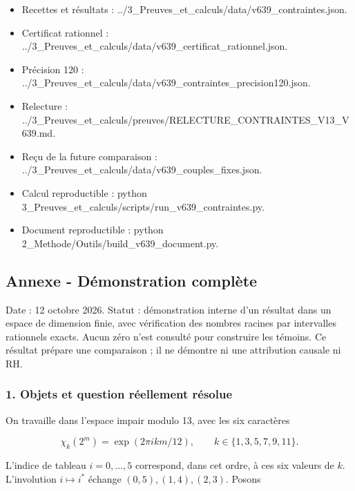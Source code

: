 \documentclass[
  10pt,
  a4paper,
]{article}
\providecommand{\tightlist}{%
  \setlength{\itemsep}{0pt}\setlength{\parskip}{0pt}}
\begin{document}
\begin{itemize}
\tightlist
\item
  Recettes et résultats :
  ../3\_Preuves\_et\_calculs/data/v639\_contraintes.json.
\item
  Certificat rationnel :
  ../3\_Preuves\_et\_calculs/data/v639\_certificat\_rationnel.json.
\item
  Précision 120 :
  ../3\_Preuves\_et\_calculs/data/v639\_contraintes\_precision120.json.
\item
  Relecture :
  ../3\_Preuves\_et\_calculs/preuves/RELECTURE\_CONTRAINTES\_V13\_V639.md.
\item
  Reçu de la future comparaison :
  ../3\_Preuves\_et\_calculs/data/v639\_couples\_fixes.json.
\item
  Calcul reproductible : python
  3\_Preuves\_et\_calculs/scripts/run\_v639\_contraintes.py.
\item
  Document reproductible : python
  2\_Methode/Outils/build\_v639\_document.py.
\end{itemize}

\hypertarget{annexe---duxe9monstration-compluxe8te}{%
\subsection{Annexe - Démonstration
complète}\label{annexe---duxe9monstration-compluxe8te}}

Date : 12 octobre 2026. Statut : démonstration interne d'un résultat
dans un espace de dimension finie, avec vérification des nombres racines
par intervalles rationnels exacts. Aucun zéro n'est consulté pour
construire les témoins. Ce résultat prépare une comparaison ; il ne
démontre ni une attribution causale ni RH.

\hypertarget{objets-et-question-ruxe9ellement-ruxe9solue}{%
\subsubsection{1. Objets et question réellement
résolue}\label{objets-et-question-ruxe9ellement-ruxe9solue}}

On travaille dans l'espace impair modulo 13, avec les six caractères

\[
\chi_k(2^m)=\exp(2\pi i km/12),\qquad k\in\{1,3,5,7,9,11\}.
\]

L'indice de tableau \(i=0,\ldots,5\) correspond, dans cet ordre, à ces
six valeurs de \(k\). L'involution \(i\mapsto i^*\) échange
\((0,5),(1,4),(2,3)\). Posons
\end{document}
